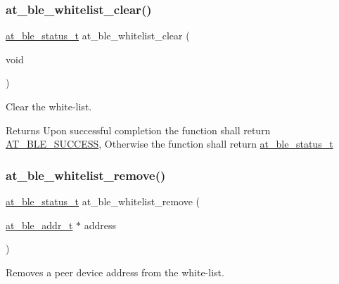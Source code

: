 \subsubsection{\texorpdfstring{at\_ble\_whitelist\_clear()}{at\_ble\_whitelist\_clear()}}
{\footnotesize\ttfamily \mbox{\hyperlink{group__error__codes__group_ga3b1db9b95feb157b3c188ca27fe76988}{at\+\_\+ble\+\_\+status\+\_\+t}} at\+\_\+ble\+\_\+whitelist\+\_\+clear (\begin{DoxyParamCaption}\item[{void}]{ }\end{DoxyParamCaption})}



Clear the white-\/list. 

\begin{DoxyReturn}{Returns}
Upon successful completion the function shall return \mbox{\hyperlink{group__error__codes__group_gga3b1db9b95feb157b3c188ca27fe76988a7e3bfff5387331cd4f2c56cbcbbd7e19}{A\+T\+\_\+\+B\+L\+E\+\_\+\+S\+U\+C\+C\+E\+SS}}, Otherwise the function shall return \mbox{\hyperlink{at__ble__api_8h_ace24eb4e5ca3f325c663b809da5feb92}{at\+\_\+ble\+\_\+status\+\_\+t}} 
\end{DoxyReturn}
\mbox{\label{group__gap__whitelist__group_ga4ca7d64ac40fa8d67b3f7a39058b6b4e}} 
\subsubsection{\texorpdfstring{at\_ble\_whitelist\_remove()}{at\_ble\_whitelist\_remove()}}
{\footnotesize\ttfamily \mbox{\hyperlink{group__error__codes__group_ga3b1db9b95feb157b3c188ca27fe76988}{at\+\_\+ble\+\_\+status\+\_\+t}} at\+\_\+ble\+\_\+whitelist\+\_\+remove (\begin{DoxyParamCaption}\item[{\mbox{\hyperlink{structat__ble__addr__t}{at\+\_\+ble\+\_\+addr\+\_\+t}} $\ast$}]{address }\end{DoxyParamCaption})}



Removes a peer device address from the white-\/list. 


